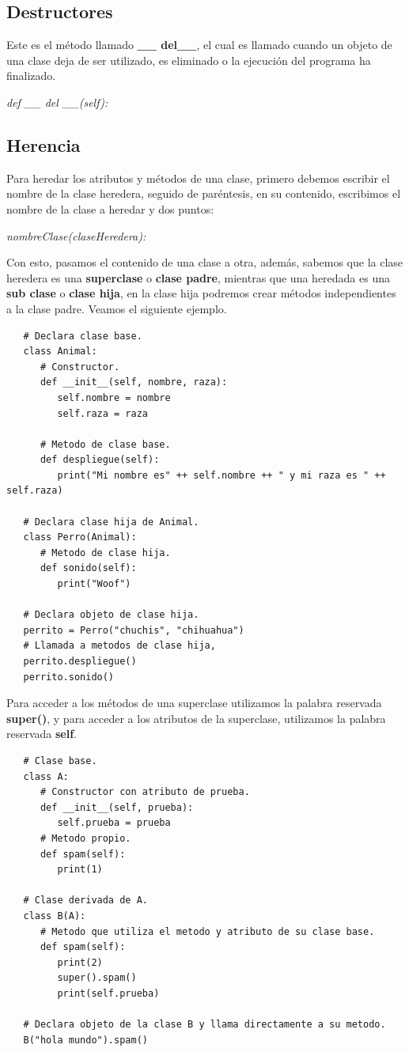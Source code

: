 \subsection{Destructores}
\hspace{0.55cm}Este es el método llamado \textbf{\_\_ del\_\_}, el cual es llamado cuando un objeto de una clase deja de ser utilizado, es eliminado o la ejecución del programa ha finalizado.
\begin{center}
	\textit{def \_\_ del \_\_(self):}
\end{center}


\subsection{Herencia}
\hspace{0.55cm}Para heredar los atributos y métodos de una clase, primero debemos escribir el nombre de la clase heredera, seguido de paréntesis, en su contenido, escribimos el nombre de la clase a heredar y dos puntos:
\begin{center}
   \textit{nombreClase(claseHeredera):}
\end{center}

Con esto, pasamos el contenido de una clase a otra, además, sabemos que la clase heredera es una \textbf{superclase} o \textbf{clase padre}, mientras que una heredada es una \textbf{sub clase} o \textbf{clase hija}, en la clase hija podremos crear métodos independientes a la clase padre. Veamos el siguiente ejemplo.
\begin{lstlisting}
   # Declara clase base.
   class Animal:
      # Constructor.
      def __init__(self, nombre, raza):
         self.nombre = nombre
         self.raza = raza
      
      # Metodo de clase base.
      def despliegue(self):
         print("Mi nombre es" ++ self.nombre ++ " y mi raza es " ++ self.raza)
   
   # Declara clase hija de Animal.
   class Perro(Animal):
      # Metodo de clase hija.
      def sonido(self):
         print("Woof")
         
   # Declara objeto de clase hija.
   perrito = Perro("chuchis", "chihuahua")
   # Llamada a metodos de clase hija,
   perrito.despliegue()
   perrito.sonido()
\end{lstlisting}

Para acceder a los métodos de una superclase utilizamos la palabra reservada \textbf{super()}, y para acceder a los atributos de la superclase, utilizamos la palabra reservada \textbf{self}.
\begin{lstlisting}
   # Clase base.
   class A:
      # Constructor con atributo de prueba.
      def __init__(self, prueba):
         self.prueba = prueba
      # Metodo propio.
      def spam(self):
         print(1)

   # Clase derivada de A.
   class B(A):
      # Metodo que utiliza el metodo y atributo de su clase base.
      def spam(self):
         print(2)
         super().spam()
         print(self.prueba)

   # Declara objeto de la clase B y llama directamente a su metodo.
   B("hola mundo").spam()
\end{lstlisting}


